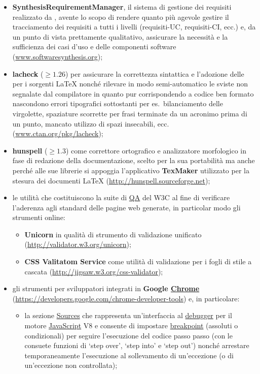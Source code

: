 \begin{itemize}
  \item \textbf{SynthesisRequirementManager}, il sistema di gestione dei requisiti realizzato da \team, avente lo scopo di rendere quanto più agevole gestire il tracciamento dei requisiti a tutti i livelli (requisiti-UC, requisiti-CI, ecc.) e, da un punto di vista prettamente qualitativo, assicurare la necessità e la sufficienza dei casi d'uso e delle componenti software (\url{www.softwaresynthesis.org});
 \item \textbf{lacheck} ($\geq 1.26$) per assicurare la correttezza sintattica e l'adozione delle  per i sorgenti \LaTeX{} nonché rilevare in modo semi-automatico le sviste non segnalate dal compilatore in quanto pur corrispondendo a codice ben formato nascondono errori tipografici sottostanti per es.~bilanciamento delle virgolette, spaziature scorrette per frasi terminate da un acronimo prima di un punto, mancato utilizzo di spazi insecabili, ecc. (\url{www.ctan.org/pkg/lacheck});
 \item \textbf{hunspell} ($\geq 1.3$) come correttore ortografico e analizzatore morfologico in fase di redazione della documentazione, scelto per la sua portabilità ma anche  perché alle sue librerie si appoggia l'applicativo \textbf{TexMaker} utilizzato per la stesura dei documenti \LaTeX{} (\url{http://hunspell.sourceforge.net});
 \item le utilità che costituiscono la suite di \underline{QA} del W3C al fine di verificare l'aderenza agli standard delle pagine web generate, in particolar modo gli strumenti online:
 \begin{itemize}
   \item \textbf{Unicorn} in qualità di strumento di validazione unificato (\url{http://validator.w3.org/unicorn});
   \item \textbf{CSS Valitatom Service} come utilità di validazione per i fogli di stile a cascata (\url{http://jigsaw.w3.org/css-validator});
 \end{itemize}
 \item gli strumenti per sviluppatori integrati in \textbf{Google \underline{Chrome}} (\url{https://developers.google.com/chrome-developer-tools}) e, in particolare:
   \begin{itemize}
   \item la sezione \underline{Sources} che rappresenta un'interfaccia al \underline{debugger} per il motore \underline{JavaScript} V8 e consente di impostare \underline{breakpoint} (assoluti o condizionali) per seguire l'esecuzione del codice passo passo (con le consuete funzioni di `step over', `step into' e `step out') nonché arrestare temporaneamente l'esecuzione al sollevamento di un'eccezione (o di un'eccezione non controllata);

\end{itemize}
\end{itemize}
